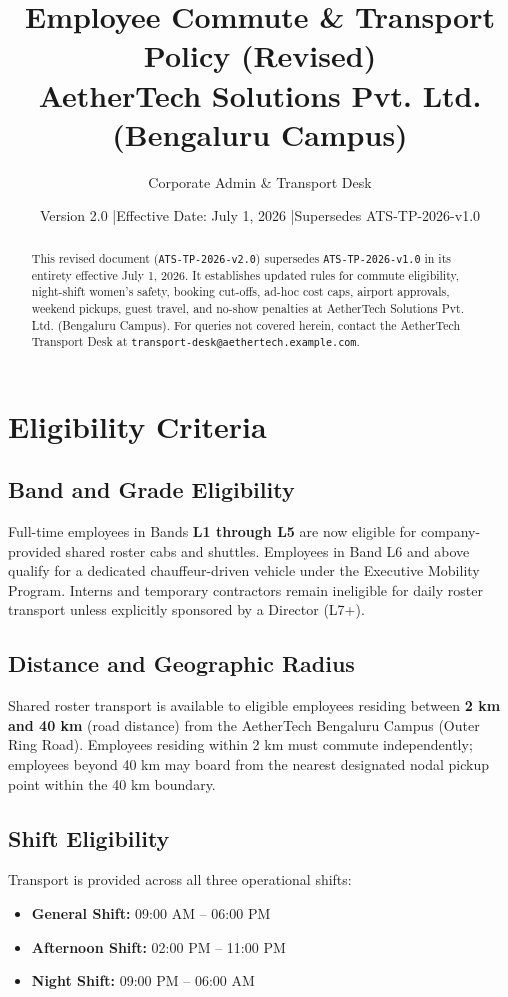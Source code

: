 \documentclass[11pt,a4paper]{article}
\title{\textbf{Employee Commute \& Transport Policy (Revised)}\\[0.4em]
\large AetherTech Solutions Pvt. Ltd. (Bengaluru Campus)}
\author{Corporate Admin \& Transport Desk}
\date{Version 2.0 \quad|\quad Effective Date: July 1, 2026 \quad|\quad Supersedes ATS-TP-2026-v1.0}
\begin{document}
\maketitle
\thispagestyle{fancy}

\begin{abstract}
This revised document (\texttt{ATS-TP-2026-v2.0}) supersedes \texttt{ATS-TP-2026-v1.0} in its entirety effective July 1, 2026. It establishes updated rules for commute eligibility, night-shift women's safety, booking cut-offs, ad-hoc cost caps, airport approvals, weekend pickups, guest travel, and no-show penalties at AetherTech Solutions Pvt. Ltd. (Bengaluru Campus). For queries not covered herein, contact the AetherTech Transport Desk at \texttt{transport-desk@aethertech.example.com}.
\end{abstract}

\section{Eligibility Criteria}
\subsection{Band and Grade Eligibility}
Full-time employees in Bands \textbf{L1 through L5} are now eligible for company-provided shared roster cabs and shuttles. Employees in Band L6 and above qualify for a dedicated chauffeur-driven vehicle under the Executive Mobility Program. Interns and temporary contractors remain ineligible for daily roster transport unless explicitly sponsored by a Director (L7+).

\subsection{Distance and Geographic Radius}
Shared roster transport is available to eligible employees residing between \textbf{2 km and 40 km} (road distance) from the AetherTech Bengaluru Campus (Outer Ring Road). Employees residing within 2 km must commute independently; employees beyond 40 km may board from the nearest designated nodal pickup point within the 40 km boundary.

\subsection{Shift Eligibility}
Transport is provided across all three operational shifts:
\begin{itemize}[noitemsep]
    \item \textbf{General Shift:} 09:00 AM -- 06:00 PM
    \item \textbf{Afternoon Shift:} 02:00 PM -- 11:00 PM
    \item \textbf{Night Shift:} 09:00 PM -- 06:00 AM
\end{itemize}
\end{document}
